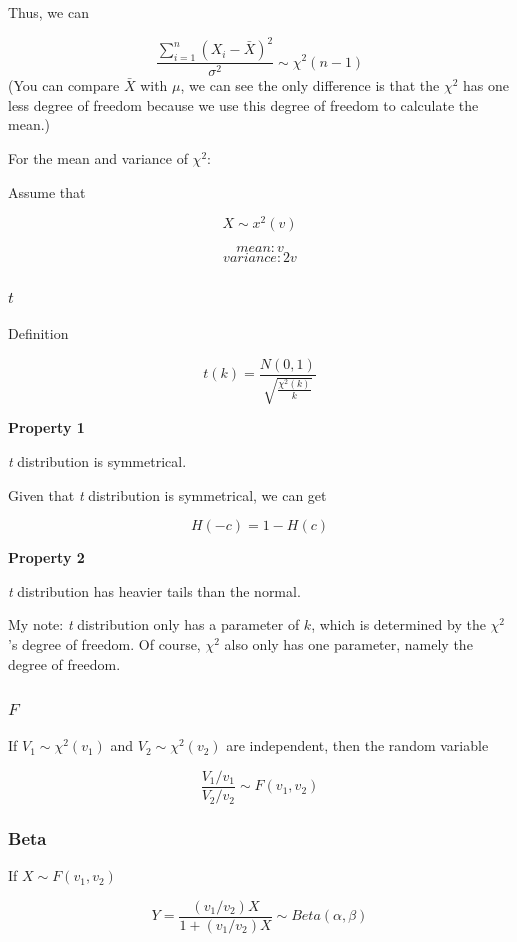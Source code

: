 \documentclass[]{book}
\begin{document}
Thus, we can

\[\frac{\sum_{i=1}^n(X_i-\bar{X})^2}{\sigma^2}\sim \chi^2(n-1)\]
(You can compare \(\bar{X}\) with \(\mu\), we can see the only difference is that the \(\chi^2\) has one less degree of freedom because we use this degree of freedom to calculate the mean.)

For the mean and variance of \(\chi^2\):

Assume that

\[X \sim x^2(v)\]

\[mean:v\]
\[variance: 2v\]

\hypertarget{t}{%
\subsubsection{\texorpdfstring{\(t\)}{t}}\label{t}}

Definition

\[t(k)=\frac{N(0,1)}{\sqrt{\frac{\chi^2(k)}{k}}}\]

\textbf{Property 1}

\emph{t} distribution is symmetrical.

Given that \emph{t} distribution is symmetrical, we can get

\[H(-c)=1-H(c)\]

\textbf{Property 2}

\emph{t} distribution has heavier tails than the normal.

My note: \emph{t} distribution only has a parameter of \(k\), which is determined by the \(\chi^2\)'s degree of freedom. Of course, \(\chi^2\) also only has one parameter, namely the degree of freedom.

\hypertarget{f}{%
\subsubsection{\texorpdfstring{\(F\)}{F}}\label{f}}

If \(V_1 \sim \chi^2(v_1)\) and \(V_2 \sim \chi^2(v_2)\) are independent, then the random variable

\[\frac{V_1/v_1}{V_2/v_2}\sim F(v_1,v_2)\]

\hypertarget{beta}{%
\subsubsection{Beta}\label{beta}}

If \(X \sim F(v_1, v_2)\)

\[Y=\frac{(v_1/v_2)X}{1+(v_1/v_2)X} \sim Beta(\alpha, \beta)\]
\end{document}
